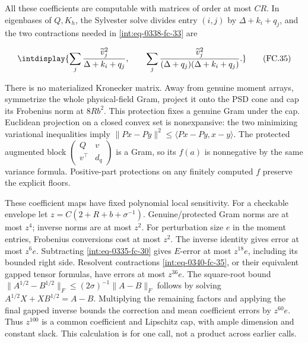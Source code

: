 
All these coefficients are computable with matrices of order at most \(CR\). In eigenbases of \(Q,\allowbreak K_h\), the Sylvester solve divides entry \((i,\allowbreak j)\) by \(\Delta+k_i+q_j\), and the two contractions needed in \eqref{int:eq-0338-fc-33} are


\begingroup\renewcommand{\theHequation}{intdisplay.737}
\begin{equation}
\intdisplay{
\sum_j\frac{\widetilde v_j^2}{\Delta+k_i+q_j},\qquad
\sum_j\frac{\widetilde v_j^2}{(\Delta+q_j)(\Delta+k_i+q_j)}.
}
\tag{FC.35}
\label{int:eq-0340-fc-35}
\end{equation}
\endgroup


There is no materialized Kronecker matrix. Away from genuine moment arrays, symmetrize the whole physical-field Gram, project it onto the PSD cone and cap its Frobenius norm at \(8R b^2\). This protection fixes a genuine Gram under the cap. Euclidean projection on a closed convex set is nonexpansive: the two minimizing variational inequalities imply \(\|Px-Py\|^2\le\langle Px-Py,\allowbreak x-y\rangle\). The protected augmented block \(\left(\begin{smallmatrix}Q&v\\v^\top&d_q \end{smallmatrix}\right)\) is a Gram, so its \(f(a)\) is nonnegative by the same variance formula. Positive-part protections on any finitely computed \(f\) preserve the explicit floors.



These coefficient maps have fixed polynomial local sensitivity. For a checkable envelope let \(z=C(2+R+b+\sigma^{-1})\). Genuine/protected Gram norms are at most \(z^4\); inverse norms are at most \(z^2\). For perturbation size \(e\) in the moment entries, Frobenius conversions cost at most \(z^2\). The inverse identity gives error at most \(z^6e\). Subtracting \eqref{int:eq-0335-fc-30} gives \(E\)-error at most \(z^{18}e\), including its bounded right side. Resolvent contractions \eqref{int:eq-0340-fc-35}, or their equivalent gapped tensor formulas, have errors at most \(z^{36}e\). The square-root bound \(\|A^{1/2}-B^{1/2}\|_F\le(2\sigma)^{-1}\|A-B\|_F\) follows by solving \(A^{1/2}X+XB^{1/2}=A-B\). Multiplying the remaining factors and applying the final gapped inverse bounds the correction and mean coefficient errors by \(z^{60}e\). Thus \(z^{100}\) is a common coefficient and Lipschitz cap, with ample dimension and constant slack. This calculation is for one call, not a product across earlier calls.



